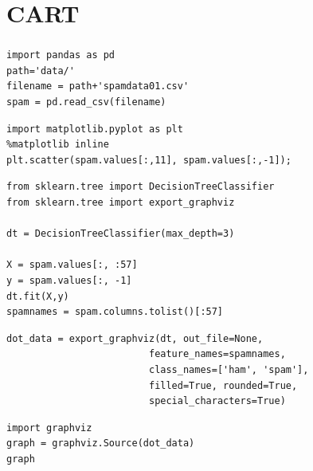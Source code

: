 \section{CART}

\begin{frame}[fragile]\frametitle{}
\tiny	
\begin{lstlisting}
import pandas as pd
path='data/'
filename = path+'spamdata01.csv'
spam = pd.read_csv(filename)
\end{lstlisting} 

\begin{lstlisting}
import matplotlib.pyplot as plt
%matplotlib inline 
plt.scatter(spam.values[:,11], spam.values[:,-1]);
\end{lstlisting} 

\begin{lstlisting}
from sklearn.tree import DecisionTreeClassifier
from sklearn.tree import export_graphviz

dt = DecisionTreeClassifier(max_depth=3)

X = spam.values[:, :57]
y = spam.values[:, -1]
dt.fit(X,y)
spamnames = spam.columns.tolist()[:57]
\end{lstlisting} 

\begin{lstlisting}
dot_data = export_graphviz(dt, out_file=None, 
                         feature_names=spamnames,  
                         class_names=['ham', 'spam'],  
                         filled=True, rounded=True,  
                         special_characters=True)  
\end{lstlisting} 
\begin{lstlisting}
import graphviz
graph = graphviz.Source(dot_data)  
graph 
\end{lstlisting} 
\end{frame}


